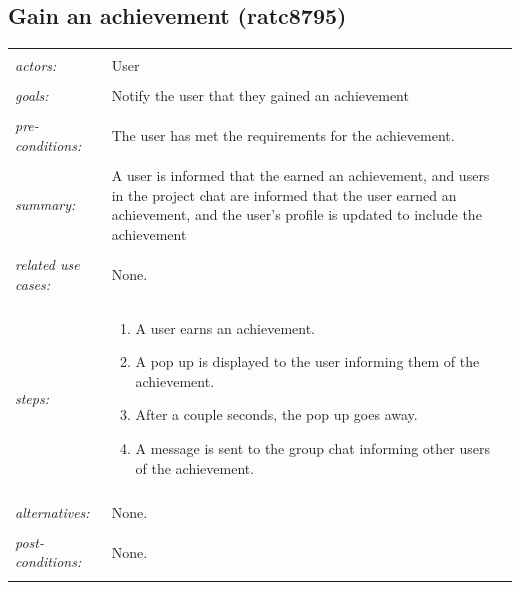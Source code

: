 \documentclass[11pt]{report}
\begin{document}
\subsection{Gain an achievement (ratc8795)}
\begin{tabular}{ p{2cm} p{12cm} }
 \hline
 \\
 \textit{actors:} & User \\ 
 \\
 \textit{goals:} & Notify the user that they gained an achievement \\
 \\
 \textit{pre-conditions:} & The user has met the requirements for the achievement. \\
 \\
 \textit{summary:} & A user is informed that the earned an achievement, and users in the project chat are informed that the user earned an achievement, and the user's profile is updated to include the achievement \\ 
 \\
 \textit{related use cases:} & None. \\ 
 \\
 \textit{steps:} & \begin{enumerate}
  \item A user earns an achievement.
  \item A pop up is displayed to the user informing them of the achievement.
  \item After a couple seconds, the pop up goes away.
  \item A message is sent to the group chat informing other users of the achievement.
 \end{enumerate} \\
 \\
 \textit{alternatives:} & None. \\
 \\
 \textit{post-conditions:} & None. \\
 \\
\hline
\end{tabular}
\end{document}

